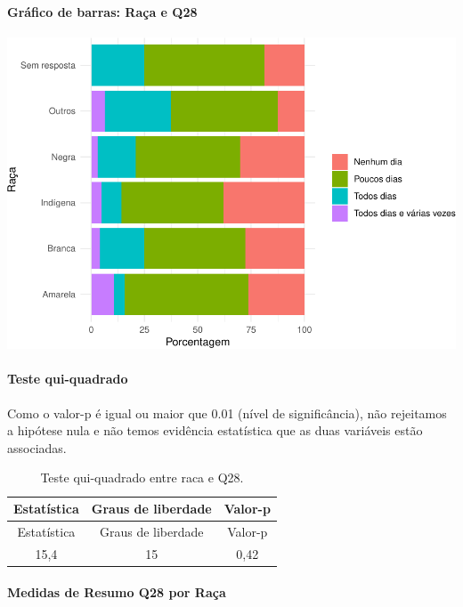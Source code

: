 \documentclass[]{article}
\let\oldparagraph\paragraph
\renewcommand{\paragraph}[1]{\oldparagraph{#1}\mbox{}}
\begin{document}
\hypertarget{gruxe1fico-de-barras-rauxe7a-e-q28}{%
\paragraph{Gráfico de barras: Raça e Q28}\label{gruxe1fico-de-barras-rauxe7a-e-q28}}

\begin{center}\includegraphics[width=0.75\linewidth]{relatorio_covid19_files/figure-latex/unnamed-chunk-870-1} \end{center}

\hypertarget{teste-qui-quadrado-75}{%
\paragraph{Teste qui-quadrado}\label{teste-qui-quadrado-75}}

Como o valor-p é igual ou maior que 0.01 (nível de significância), não rejeitamos a hipótese nula e não temos evidência estatística que as duas variáveis estão associadas.

\begin{longtable}[]{@{}ccc@{}}
\caption{\label{tab:unnamed-chunk-872}Teste qui-quadrado entre raca e Q28.}\tabularnewline
\toprule
Estatística & Graus de liberdade & Valor-p\tabularnewline
\midrule
\endfirsthead
\toprule
Estatística & Graus de liberdade & Valor-p\tabularnewline
\midrule
\endhead
15,4 & 15 & 0,42\tabularnewline
\bottomrule
\end{longtable}

\cleardoublepage

\hypertarget{medidas-de-resumo-q28-por-rauxe7a}{%
\paragraph{Medidas de Resumo Q28 por Raça}\label{medidas-de-resumo-q28-por-rauxe7a}}
\end{document}
